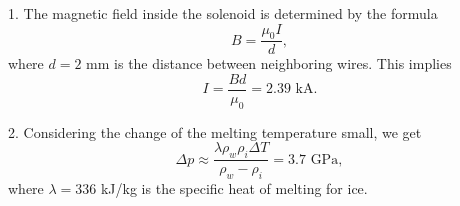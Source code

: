 \documentclass[12pt,a4paper,pdflatex]{disser}
\begin{document}
1. The magnetic field inside the solenoid is determined by the formula
$$
  B=\frac{\mu_0 I}{d},
$$
where $d=2$ mm is the distance between neighboring wires. This implies
$$
  I=\frac{Bd}{\mu_0}=2.39 \text{ kA}.
$$

2. Considering the change of the melting temperature small, we get
$$
  \Delta p\approx \frac{\lambda\rho_w \rho_i \Delta T}{\rho_w-\rho_i}=3.7 \text{ GPa},
$$
where $\lambda=336$ kJ/kg is the specific heat of melting for ice.
\end{document}
